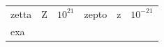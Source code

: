 {{\begin{center}
\begin{xtabular}[t]{|l|l|l|l|l|l|}
    
        zetta &
    
    
        Z &
    
    
        
                \begin{math}{10}^{21}\end{math}
               &
    
    
        zepto &
    
    
        z &
    
    
        
                \begin{math}{10}^{-21}\end{math}
     \tabularnewline{}
    
    
        exa &
    
    

\end{xtabular}
\end{center}}}
